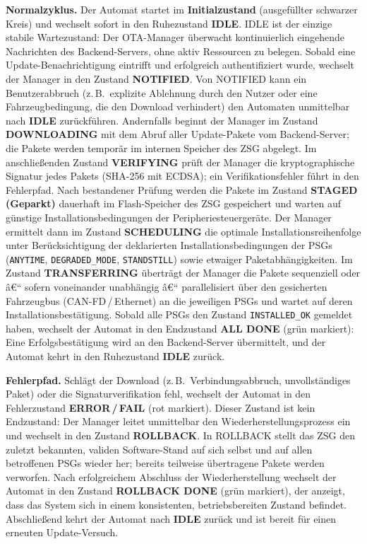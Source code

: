 ﻿\documentclass[12pt,a4paper,twoside]{article}
\begin{document}
\smallskip
\noindent\textbf{Normalzyklus.}
Der Automat startet im \textbf{Initialzustand} (ausgefüllter schwarzer
Kreis) und wechselt sofort in den Ruhezustand \textbf{IDLE}.
IDLE ist der einzige stabile Wartezustand: Der OTA-Manager überwacht
kontinuierlich eingehende Nachrichten des Backend-Servers, ohne aktiv
Ressourcen zu belegen.
Sobald eine Update-Benachrichtigung eintrifft und erfolgreich
authentifiziert wurde, wechselt der Manager in den Zustand
\textbf{NOTIFIED}.
Von NOTIFIED kann ein Benutzerabbruch (z.\,B.\ explizite Ablehnung durch
den Nutzer oder eine Fahrzeugbedingung, die den Download verhindert) den
Automaten unmittelbar nach \textbf{IDLE} zurückführen.
Andernfalls beginnt der Manager im Zustand \textbf{DOWNLOADING} mit dem
Abruf aller Update-Pakete vom Backend-Server; die Pakete werden temporär
im internen Speicher des ZSG abgelegt.
Im anschließenden Zustand \textbf{VERIFYING} prüft der Manager die
kryptographische Signatur jedes Pakets (SHA-256 mit ECDSA); ein
Verifikationsfehler führt in den Fehlerpfad.
Nach bestandener Prüfung werden die Pakete im Zustand
\textbf{STAGED (Geparkt)} dauerhaft im Flash-Speicher des ZSG
gespeichert und warten auf günstige Installationsbedingungen der
Peripheriesteuergeräte.
Der Manager ermittelt dann im Zustand \textbf{SCHEDULING} die optimale
Installationsreihenfolge unter Berücksichtigung der deklarierten
Installationsbedingungen der PSGs (\texttt{ANYTIME},
\texttt{DEGRADED\_MODE}, \texttt{STANDSTILL}) sowie etwaiger
Paketabhängigkeiten.
Im Zustand \textbf{TRANSFERRING} überträgt der Manager die Pakete
sequenziell oder â€“ sofern voneinander unabhängig â€“ parallelisiert über
den gesicherten Fahrzeugbus (CAN-FD\,/\,Ethernet) an die jeweiligen
PSGs und wartet auf deren Installationsbestätigung.
Sobald alle PSGs den Zustand \texttt{INSTALLED\_OK} gemeldet haben,
wechselt der Automat in den Endzustand \textbf{ALL DONE} (grün
markiert): Eine Erfolgsbestätigung wird an den Backend-Server übermittelt,
und der Automat kehrt in den Ruhezustand \textbf{IDLE} zurück.

\smallskip
\noindent\textbf{Fehlerpfad.}
Schlägt der Download (z.\,B.\ Verbindungsabbruch, unvollständiges Paket)
oder die Signaturverifikation fehl, wechselt der Automat in den
Fehlerzustand \textbf{ERROR\,/\,FAIL} (rot markiert).
Dieser Zustand ist kein Endzustand: Der Manager leitet unmittelbar den
Wiederherstellungsprozess ein und wechselt in den Zustand
\textbf{ROLLBACK}.
In ROLLBACK stellt das ZSG den zuletzt bekannten, validen Software-Stand
auf sich selbst und auf allen betroffenen PSGs wieder her;
bereits teilweise übertragene Pakete werden verworfen.
Nach erfolgreichem Abschluss der Wiederherstellung wechselt der Automat
in den Zustand \textbf{ROLLBACK DONE} (grün markiert), der anzeigt, dass
das System sich in einem konsistenten, betriebsbereiten Zustand befindet.
Abschließend kehrt der Automat nach \textbf{IDLE} zurück und ist bereit
für einen erneuten Update-Versuch.
\end{document}
